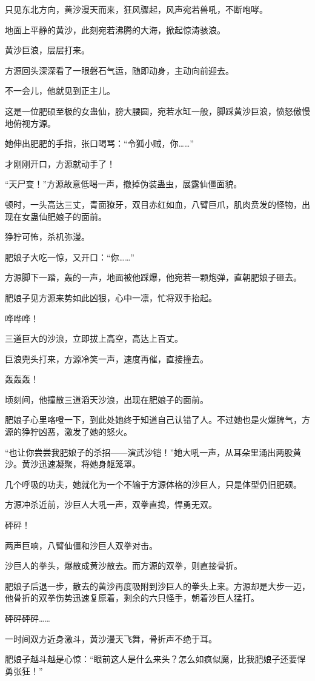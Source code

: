\begin{this_body}
只见东北方向，黄沙漫天而来，狂风骤起，风声宛若兽吼，不断咆哮。

地面上平静的黄沙，此刻宛若沸腾的大海，掀起惊涛骇浪。

黄沙巨浪，层层打来。

方源回头深深看了一眼磐石气运，随即动身，主动向前迎去。

不一会儿，他就见到正主儿。

这是一位肥硕至极的女蛊仙，膀大腰圆，宛若水缸一般，脚踩黄沙巨浪，愤怒傲慢地俯视方源。

她伸出肥肥的手指，张口喝骂：“令狐小贼，你……”

才刚刚开口，方源就动手了！

“天尸变！”方源故意低喝一声，撤掉伪装蛊虫，展露仙僵面貌。

顿时，一头高达三丈，青面獠牙，双目赤红如血，八臂巨爪，肌肉贲发的怪物，出现在女蛊仙肥娘子的面前。

狰狞可怖，杀机弥漫。

肥娘子大吃一惊，又开口：“你……”

方源脚下一踏，轰的一声，地面被他踩爆，他宛若一颗炮弹，直朝肥娘子砸去。

肥娘子见方源来势如此凶狠，心中一凛，忙将双手抬起。

哗哗哗！

三道巨大的沙浪，立即拔上高空，高达上百丈。

巨浪兜头打来，方源冷笑一声，速度再催，直接撞去。

轰轰轰！

顷刻间，他撞散三道滔天沙浪，出现在肥娘子的面前。

肥娘子心里咯噔一下，到此处她终于知道自己认错了人。不过她也是火爆脾气，方源的狰狞凶恶，激发了她的怒火。

“也让你尝尝我肥娘子的杀招——演武沙铠！”她大吼一声，从耳朵里涌出两股黄沙。黄沙迅速凝聚，将她身躯笼罩。

几个呼吸的功夫，她就化为一个不输于方源体格的沙巨人，只是体型仍旧肥硕。

方源冲杀近前，沙巨人大吼一声，双拳直捣，悍勇无双。

砰砰！

两声巨响，八臂仙僵和沙巨人双拳对击。

沙巨人的拳头，爆散成黄沙散去。而方源的双拳，则直接骨折。

肥娘子后退一步，散去的黄沙再度吸附到沙巨人的拳头上来。方源却是大步一迈，他骨折的双拳伤势迅速复原着，剩余的六只怪手，朝着沙巨人猛打。

砰砰砰砰……

一时间双方近身激斗，黄沙漫天飞舞，骨折声不绝于耳。

肥娘子越斗越是心惊：“眼前这人是什么来头？怎么如疯似魔，比我肥娘子还要悍勇张狂！”

\end{this_body}

